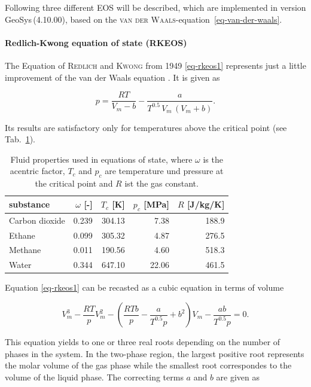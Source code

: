 Following three different EOS will be described, which are implemented in version GeoSys\,(4.10.00), based on the \textsc{van der Waals}-equation~\eqref{eq-van-der-waals}. %

\paragraph{Redlich-Kwong equation of state (RKEOS)}
The Equation of \textsc{Redlich} and \textsc{Kwong} from 1949 \eqref{eq-rkeos1} represents just a little improvement of the van der Waals equation \cite{RedKwo:49}. It is given as 														

\begin{equation}
p=\frac{RT}{V_m-b}-\frac{a}{T^{0.5}\,V_m\,(V_m+b)}.
\label{eq-rkeos1}
\end{equation}

Its results are satisfactory only for temperatures above the critical point (see Tab.~\ref{tab-eos2}). 

\begin{table}[H]
  \caption{\label{tab-eos2}Fluid properties used in equations of state, where $\omega$ is the acentric factor, $T_c$ and $p_c$ are temperature und pressure at the critical point and $R$ ist the gas constant.}
  \begin{center}
\begin{tabular}{lrrrr}
\toprule
  substance 		& $\omega$ [-]  & $T_c$ [K] & $p_c$ [MPa] & $R$ [J/kg/K]\\
\midrule
  Carbon dioxide & 0.239  			& 304.13 & 7.38 		& 188.9\\
  Ethane         & 0.099  			& 305.32	& 4.87 		& 276.5\\
  Methane        & 0.011  			& 190.56 & 4.60 		& 518.3\\
  Water          & 0.344  			& 647.10 & 22.06 		& 461.5\\
\bottomrule
\end{tabular}
\end{center}
\end{table}

Equation \eqref{eq-rkeos1} can be recasted as a cubic equation in terms of volume

\begin{equation}
V_m^3-\frac{RT}{p}V_m^2-\left(\frac{RTb}{p}-\frac{a}{T^{0.5}p}+b^2\right)V_m-\frac{ab}{T^{0.5}p}=0.
\label{eq-rkeos2}
\end{equation}
              
This equation yields to one or three real roots depending on the number of phases in the system. In the two-phase region, the largest positive root represents the molar volume of the gas phase while the smallest root correspondes to the volume of the liquid phase. The correcting terms $a$ and $b$ are given as
													
